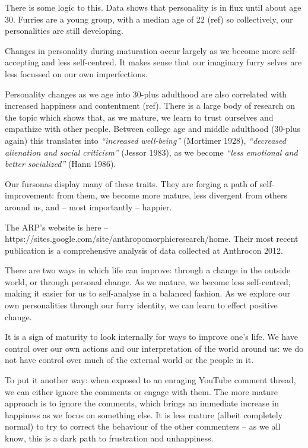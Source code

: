 There is some logic to this. Data shows that personality is in flux until about age 30. Furries are a young group, with a median age of 22 (ref) so collectively, our personalities are still developing.

Changes in personality during maturation occur largely as we become more self-accepting and less self-centred. It makes sense that our imaginary furry selves are less focussed on our own imperfections.

Personality changes as we age into 30-plus adulthood are also correlated with increased happiness and contentment (ref). There is a large body of research on the topic which shows that, as we mature, we learn to trust ourselves and empathize with other people. Between college age and middle adulthood (30-plus again) this translates into \textit{``increased well-being''} (Mortimer 1928), \textit{``decreased alienation and social criticism''} (Jessor 1983), as we become \textit{``less emotional and better socialized''} (Hann 1986).

Our fursonas display many of these traits. They are forging a path of self-improvement: from them, we become more mature, less divergent from others around us, and -- most importantly -- happier.

The ARP's website is here -- https://sites.google.com/site/anthropomorphicresearch/home. Their most recent publication is a comprehensive analysis of data collected at Anthrocon 2012.

There are two ways in which life can improve: through a change in the outside world, or through personal change. As we mature, we become less self-centred, making it easier for us to self-analyse in a balanced fashion. As we explore our own personalities through our furry identity, we can learn to effect positive change.

It is a sign of maturity to look internally for ways to improve one's life. We have control over our own actions and our interpretation of the world around us: we do not have control over much of the external world or the people in it.

To put it another way: when exposed to an enraging YouTube comment thread, we can either ignore the comments or engage with them. The more mature approach is to ignore the comments, which brings an immediate increase in happiness as we focus on something else. It is less mature (albeit completely normal) to try to correct the behaviour of the other commenters -- as we all know, this is a dark path to frustration and unhappiness.


